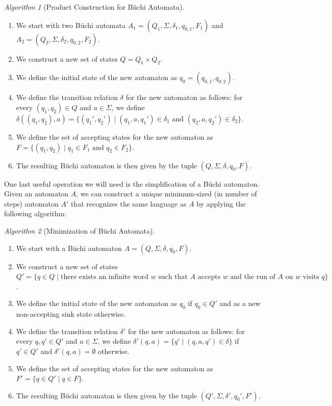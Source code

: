 \documentclass[11pt]{article}
\theoremstyle{definition}
\theoremstyle{remark}
\newtheorem{algorithm}{Algorithm}
\begin{document}
\begin{algorithm}[Product Construction for Büchi Automata]\label{def:product-construction}
\begin{enumerate}[leftmargin=1.5em]
  \item We start with two Büchi automata $A_1=(Q_1,\Sigma,\delta_1,q_{0,1},F_1)$ and $A_2=(Q_2,\Sigma,\delta_2,q_{0,2},F_2)$.
  \item We construct a new set of states $Q=Q_1 \times Q_2$.
  \item We define the initial state of the new automaton as $q_0=(q_{0,1},q_{0,2})$.
  \item We define the transition relation $\delta$ for the new automaton as follows: for every $(q_1,q_2) \in Q$ and $a \in \Sigma$, we define $\delta((q_1,q_2),a)=\{ (q_1',q_2') \mid (q_1,a,q_1') \in \delta_1 \text{ and } (q_2,a,q_2') \in \delta_2 \}$.
  \item We define the set of accepting states for the new automaton as $F=\{ (q_1,q_2) \mid q_1 \in F_1 \text{ and } q_2 \in F_2 \}$.
  \item The resulting Büchi automaton is then given by the tuple $(Q,\Sigma,\delta,q_0,F)$.
\end{enumerate}
\end{algorithm}

One last useful operation we will need is the simplification of a Büchi automaton. Given an automaton $A$, we can construct a unique minimum-sized (in number of steps) automaton $A'$ that recognizes the same language as $A$ by applying the following algorithm:

\begin{algorithm}[Minimization of Büchi Automata]\label{def:minimization}
\begin{enumerate}[leftmargin=1.5em]
  \item We start with a Büchi automaton $A=(Q,\Sigma,\delta,q_0,F)$.
  \item We construct a new set of states $Q'=\{ q \in Q \mid \text{there exists an infinite word } w \text{ such that } A \text{ accepts } w \text{ and the run of } A \text{ on } w \text{ visits } q \}$.
  \item We define the initial state of the new automaton as $q_0$ if $q_0 \in Q'$ and as a new non-accepting sink state otherwise.
  \item We define the transition relation $\delta'$ for the new automaton as follows: for every $q,q' \in Q'$ and $a \in \Sigma$, we define $\delta'(q,a)=\{ q' \mid (q,a,q') \in \delta \}$ if $q' \in Q'$ and $\delta'(q,a)=\emptyset$ otherwise.
  \item We define the set of accepting states for the new automaton as $F'=\{ q \in Q' \mid q \in F \}$.
  \item The resulting Büchi automaton is then given by the tuple $(Q',\Sigma,\delta',q_0',F')$.
\end{enumerate}
\end{algorithm}
\end{document}
